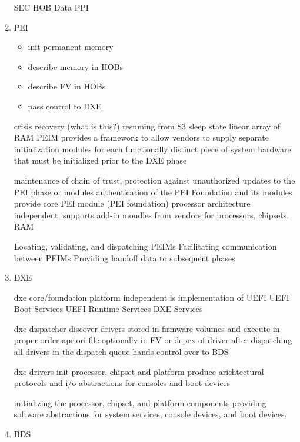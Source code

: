 \begin{enumerate}
    SEC HOB Data PPI

    \item{\acf{PEI}}

    \begin{itemize}
        \item init permanent memory
        \item describe memory in \acp{HOB}
        \item describe \ac{FV} in \acp{HOB}
        \item pass control to \ac{DXE}
    \end{itemize}

    crisis recovery (what is this?)
    resuming from S3 sleep state
    linear array of RAM
    \ac{PEIM} provides a framework to allow vendors to supply separate initialization modules for
    each functionally distinct piece of system hardware that must be initialized prior to the DXE phase \cite{pi-spec}

    maintenance of chain of trust, protection against unauthorized updates to the PEI phase or modules
    authentication of the PEI Foundation and its modules
    provide core PEI module (PEI foundation) processor architecture independent, supports add-in moudles from vendors for processors, chipsets, RAM

    Locating, validating, and dispatching PEIMs
    Facilitating communication between PEIMs
    Providing handoff data to subsequent phases

    \item{\acf{DXE}}

    dxe core/foundation
    platform independent
    is implementation of UEFI
    UEFI Boot Services
    UEFI Runtime Services
    DXE Services

    dxe dispatcher
    discover drivers stored in firmware volumes and execute in proper order
    apriori file optionally in FV or depex of driver
    after dispatching all drivers in the dispatch queue hands control over to BDS

    dxe drivers
    init processor, chipset and platform
    produce arichtectural protocols and i/o abstractions for consoles and boot devices

    initializing the processor, chipset, and platform components
    providing software abstractions for system services, console devices, and boot devices.

    \item{\acf{BDS}}


\end{enumerate}
